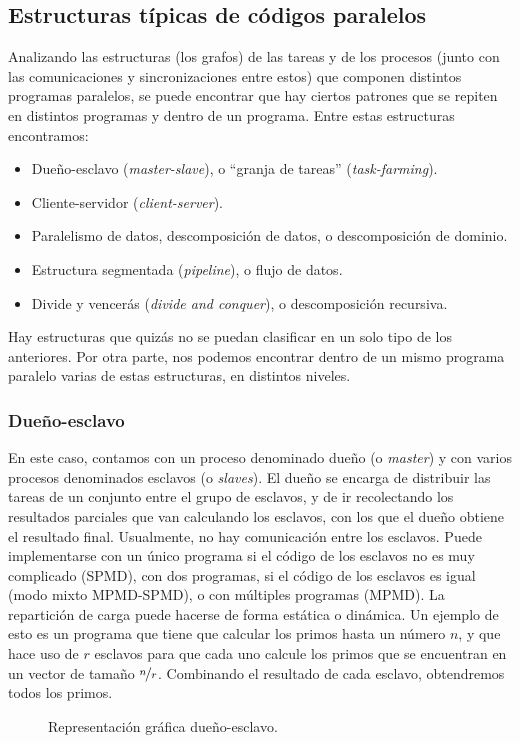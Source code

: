 \subsection{Estructuras típicas de códigos paralelos}
Analizando las estructuras (los grafos) de las tareas y de los procesos (junto con las comunicaciones y sincronizaciones entre estos) que componen distintos programas paralelos, se puede encontrar que hay ciertos patrones que se repiten en distintos programas y dentro de un programa. Entre estas estructuras encontramos:
\begin{itemize}
    \item Dueño-esclavo (\emph{master-slave}), o ``granja de tareas'' (\emph{task-farming}).
    \item Cliente-servidor (\emph{client-server}).
    \item Paralelismo de datos, descomposición de datos, o descomposición de dominio. 
    \item Estructura segmentada (\emph{pipeline}), o flujo de datos.
    \item Divide y vencerás (\emph{divide and conquer}), o descomposición recursiva. 
\end{itemize}
Hay estructuras que quizás no se puedan clasificar en un solo tipo de los anteriores. Por otra parte, nos podemos encontrar dentro de un mismo programa paralelo varias de estas estructuras, en distintos niveles.

\subsubsection{Dueño-esclavo} 
En este caso, contamos con un proceso denominado dueño (o \emph{master}) y con varios procesos denominados esclavos (o \emph{slaves}). El dueño se encarga de distribuir las tareas de un conjunto entre el grupo de esclavos, y de ir recolectando los resultados parciales que van calculando los esclavos, con los que el dueño obtiene el resultado final. Usualmente, no hay comunicación entre los esclavos.
Puede implementarse con un único programa si el código de los esclavos no es muy complicado (SPMD), con dos programas, si el código de los esclavos es igual (modo mixto MPMD-SPMD), o con múltiples programas (MPMD).
La repartición de carga puede hacerse de forma estática o dinámica.
Un ejemplo de esto es un programa que tiene que calcular los primos hasta un número $n$, y que hace uso de $r$ esclavos para que cada uno calcule los primos que se encuentran en un vector de tamaño $ \nicefrac{n}{r} $. Combinando el resultado de cada esclavo, obtendremos todos los primos.
\begin{figure}[H]
\centering
{}
\caption{Representación gráfica dueño-esclavo.}
\label{graph:dueno_esclavo}
\end{figure}


